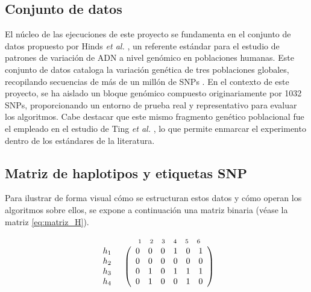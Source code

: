 \subsection{Conjunto de datos}
El núcleo de las ejecuciones de este proyecto se fundamenta en el conjunto de datos propuesto por Hinds \textit{et al.} \cite{hinds2005whole}, un referente estándar para el estudio de patrones de variación de ADN a nivel genómico en poblaciones humanas. Este conjunto de datos cataloga la variación genética de tres poblaciones globales, recopilando secuencias de más de un millón de SNPs \cite{bafna2003haplotypes}. En el contexto de este proyecto, se ha aislado un bloque genómico compuesto originariamente por 1032 SNPs, proporcionando un entorno de prueba real y representativo para evaluar los algoritmos. Cabe destacar que este mismo fragmento genético poblacional fue el empleado en el estudio de Ting \textit{et al.} \cite{ting2010multi}, lo que permite enmarcar el experimento dentro de los estándares de la literatura. 

\subsection{Matriz de haplotipos y etiquetas SNP}
Para ilustrar de forma visual cómo se estructuran estos datos y cómo operan los algoritmos sobre ellos, se expone a continuación una matriz binaria (véase la matriz \ref{eq:matriz_H}). 

\begin{equation}\label{eq:matriz_H}
\begin{array}{cc}
 & \begin{array}{cccccc}
 \text{\scriptsize 1} & \text{\scriptsize 2} & \text{\scriptsize 3} & \text{\scriptsize 4} & \text{\scriptsize 5} & \text{\scriptsize 6}
 \end{array} \\
 \begin{array}{c} h_1 \\ h_2 \\ h_3 \\ h_4 \end{array} &
 \left(\begin{array}{cccccc}
 0 & 0 & 0 & 1 & 0 & 1 \\
 0 & 0 & 0 & 0 & 0 & 0 \\
 0 & 1 & 0 & 1 & 1 & 1 \\
 0 & 1 & 0 & 0 & 1 & 0 
 \end{array}\right)
\end{array}
\end{equation}

